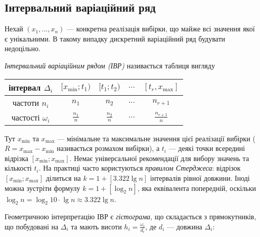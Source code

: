 \subsection{Інтервальний варіаційний ряд}
Нехай $\left(x_1, ... ,x_n\right)$ --- конкретна реалізація вибірки, що майже всі значення якої є унікальними. В такому випадку
дискретний варіаційний ряд будувати недоцільно.
\begin{definition}
    \emph{Інтервальний варіаційним рядом (ІВР)} називається таблиця вигляду
    \begin{center}
        \begin{tabular}{|c|c|c|c|c|}
            \hline
            інтервал $\Delta_i$ & $[x_{\min}; t_1)$ & $[t_1; t_2)$ & $...$ & $[t_r, x_{\max}]$ \\
            \hline
            частоти $n_i$ & $n_1$ & $n_2$ & $...$ & $n_{r+1}$ \\
            \hline
            частості $\omega_i$ & $\frac{n_1}{n}$ & $\frac{n_2}{n}$ & $...$ & $\frac{n_{r+1}}{n}$ \\
            \hline
        \end{tabular}
        \end{center}
        Тут $x_{\min}$ та $x_{\max}$ --- мінімальне та максимальне значення цієї реалізації вибірки ($R = x_{\max} - x_{\min}$ називається розмахом вибірки), а $t_i$ --- деякі точки всередині відрізка 
        $[x_{\min}; x_{\max}]$. Немає універсальної рекомендації для вибору значень та кількості $t_i$. На практиці часто користуються \emph{правилом Стерджеса}:
        відрізок $[x_{\min}; x_{\max}]$ ділиться на $k = 1 + \left[ 3.322 \lg n\right]$ інтервалів рівної довжини. Іноді можна зустріти формулу
        $k = 1 + \left[\log_2 n\right]$, яка еквівалента попередній, оскільки $\log_2 n = \log_2 10 \cdot \lg n \approx 3.322 \lg n$.
\end{definition}
Геометричною інтерпретацію ІВР є \emph{гістограма}, що складається з прямокутників, що побудовані на $\Delta_i$ та мають висоти $h_i = \frac{\omega_i}{d_i}$, де $d_i$ --- довжина $\Delta_i$:
\begin{center}
\end{center}

